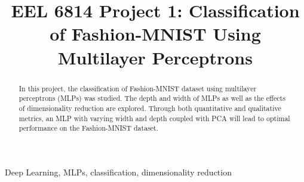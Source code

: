 \documentclass[conference]{IEEEtran}
\begin{document}
\title{EEL 6814 Project 1: Classification of Fashion-MNIST Using Multilayer Perceptrons\\}

\author{
}

\maketitle

\begin{abstract}
In this project, the classification of Fashion-MNIST dataset using multilayer perceptrons (MLPs) was studied. The depth and width of MLPs as well as the effects of dimensionality reduction are explored. Through both quantitative and qualitative metrics, an MLP with varying width and depth coupled with PCA will lead to optimal performance on the Fashion-MNIST dataset. 
\end{abstract}

\begin{IEEEkeywords}
Deep Learning, MLPs, classification, dimensionality reduction
\end{IEEEkeywords}
\end{document}
